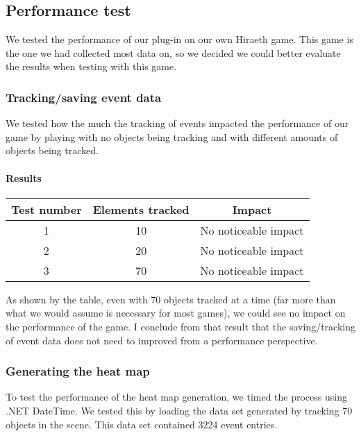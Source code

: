 \subsection{Performance test}
\label{Test_P}
We tested the performance of our plug-in on our own Hiraeth game. This game is the one we had collected most data on, so we decided we could better evaluate the results when testing with this game.

\subsubsection{Tracking/saving event data}
\label{Test_P_Saving}
We tested how the much the tracking of events impacted the performance of our game by playing with no objects being tracking and with different amounts of objects being tracked.

\paragraph{Results}
\begin{center}
\begin{tabular}{| c | c | c |}
\hline
Test number & Elements tracked & Impact \\ 
\hline
1 & 10 & No noticeable impact \\ 
\hline
2 & 20 & No noticeable impact \\ 
\hline
3 & 70 & No noticeable impact \\
\hline
\end{tabular}
\end{center}

As shown by the table, even with 70 objects tracked at a time (far more than what we would assume is necessary for most games), we could see no impact on the performance of the game. I conclude from that result that the saving/tracking of event data does not need to improved from a performance perspective.

\subsubsection{Generating the heat map}
\label{Test_P_Generating}
To test the performance of the heat map generation, we timed the process using .NET DateTime. We tested this by loading the data set generated by tracking 70 objects in the scene. This data set contained 3224 event entries.

